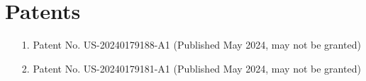 \section{Patents}

\vspace{6pt}

\begin{itemize}
    
\item[1.]{Patent No. US-20240179188-A1 (Published May 2024, may not be granted)}
    
\vspace{6pt}

\item[2.]{Patent No. US-20240179181-A1 (Published May 2024, may not be granted)}

\end{itemize}